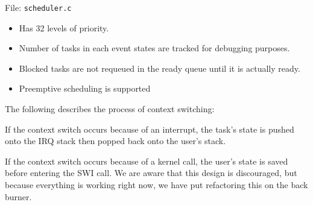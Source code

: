\documentclass[letterpaper]{article}
\begin{document}
File: \texttt{scheduler.c}
%
\begin{itemize}

\item Has 32 levels of priority.

\item Number of tasks in each event states are tracked for debugging purposes.

\item Blocked tasks are not requeued in the ready queue until it is actually ready.

\item Preemptive scheduling is supported

\end{itemize}

The following describes the process of context switching:
\setcounter{listcnt0}{0}
\begin{list}{.}
{
\setlength{\rightmargin}{\leftmargin}
}

\item \setcounter{listcnt1}{0}
\begin{list}{)}
{
\setlength{\rightmargin}{\leftmargin}
}

\item If the context switch occurs because of an interrupt, the task's state is pushed onto the IRQ stack then popped back onto the user's stack.

\item If the context switch occurs because of a kernel call, the user's state is saved before entering the SWI call.  We are aware that this design is discouraged, but because everything is working right now, we have put refactoring this on the back burner.
\end{list}
\end{list}
\end{document}
